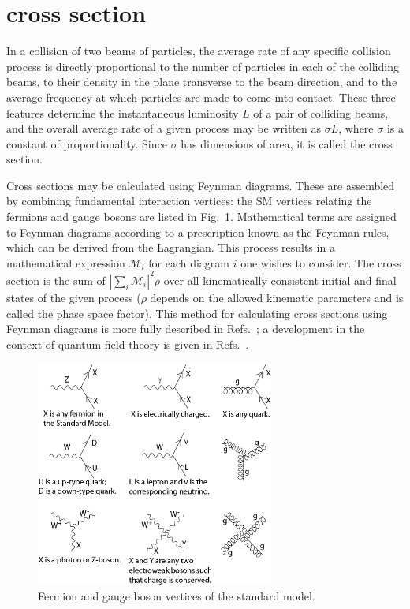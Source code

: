 \documentclass[oneside, letterpaper, 12pt, oldfontcommands]{memoir}
\begin{document}
\section{\texorpdfstring{\zinvg}{Z(νν)γ} cross section} \label{sec:introduction_znng}
In a collision of two beams of particles, the average rate of any specific collision process is directly proportional to the
number of particles in each of the colliding beams, to their density in the plane transverse to the beam direction, and to the average
frequency at which particles are made to come into contact. These three features determine the instantaneous luminosity $L$ of a pair
of colliding beams, and the overall average rate of a given process may be written as $\sigma L$, where $\sigma$
is a constant of proportionality. Since $\sigma$ has dimensions of area, it is called the cross section.

Cross sections may be calculated using Feynman diagrams. These are
assembled by combining fundamental interaction vertices: the SM vertices relating the fermions and gauge bosons are listed in Fig.~\ref{fig:sm_vertices}.
Mathematical terms are assigned to Feynman diagrams according to a prescription known as the Feynman rules, which can be derived from the Lagrangian.
This process results in a mathematical expression $\mathcal{M}_{i}$ for each diagram $i$ one wishes to consider. The cross section is the sum of $|\sum_{i}{\mathcal{M}_{i}}|^{2}\rho$
over all kinematically consistent initial and final states of the given process ($\rho$ depends on the allowed kinematic parameters and is called the phase space
factor). This method for calculating cross sections using Feynman diagrams is more fully described in Refs.~\cite{ref:HalzenMartin, ref:BargerPhillips};
a development in the context of quantum field theory is given in Refs.~\cite{ref:PeskinSchroeder, ref:Srednicki, ref:Schwartz}.

\begin{figure}[hbtp]
  \begin{center}
    \includegraphics[width=0.7\textwidth]{Figures/Standard_Model_Feynman_Diagram_Vertices.png}
    \caption{
      Fermion and gauge boson vertices of the standard model.
    }
    \label{fig:sm_vertices}
  \end{center}
\end{figure}
\end{document}
